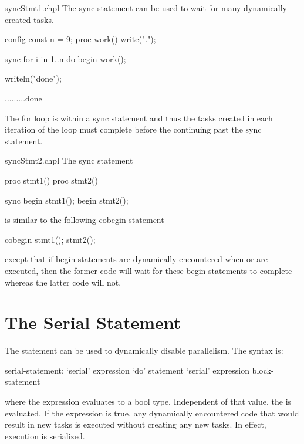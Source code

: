 \begin{chapelexample}{syncStmt1.chpl}
The sync statement can be used to wait for many dynamically created
tasks.
\begin{chapelpre}
config const n = 9;
proc work() {
  write(".");
}
\end{chapelpre}
\begin{chapel}
sync for i in 1..n do begin work();
\end{chapel}
\begin{chapelpost}
writeln("done");
\end{chapelpost}
\begin{chapeloutput}
.........done
\end{chapeloutput}
The for loop is within a sync statement and thus the tasks created
in each iteration of the loop must complete before the continuing past
the sync statement.
\end{chapelexample}

\begin{chapelexample}{syncStmt2.chpl}
The sync statement
\begin{chapelpre}
proc stmt1() { }
proc stmt2() { }
\end{chapelpre}
\begin{chapel}
sync {
  begin stmt1();
  begin stmt2();
}
\end{chapel}
is similar to the following cobegin statement
\begin{chapel}
cobegin {
  stmt1();
  stmt2();
}
\end{chapel}
\begin{chapeloutput}
\end{chapeloutput}
except that if begin statements are dynamically encountered
when  or  are executed, then the former
code will wait for these begin statements to complete whereas the
latter code will not.
\end{chapelexample}

\section{The Serial Statement}
\label{Serial}

The  statement can be used to dynamically disable
parallelism.  The syntax is:
\begin{syntax}
serial-statement:
  `serial' expression `do' statement
  `serial' expression block-statement
\end{syntax}
where the expression evaluates to a bool type.  Independent of that
value, the  is evaluated. If the expression is true,
any dynamically encountered code that would result in new tasks is
executed without creating any new tasks.  In effect, execution is
serialized.

